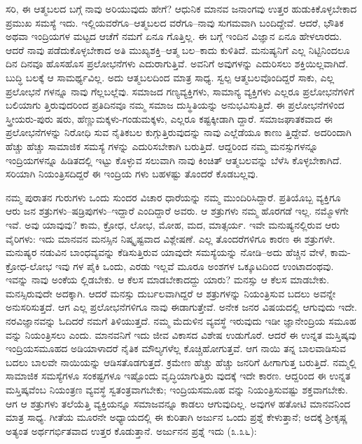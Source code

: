 ಸರಿ, ಈ ಆತ್ಮಬಲದ ಬಗ್ಗೆ ನಾವು ಅರಿಯುವುದು ಹೇಗೆ? ಆಧುನಿಕ ಮಾನವ ಜನಾಂಗವು ಉತ್ತರ ಹುಡುಕಿಕೊಳ್ಳಬೇಕಾದ ಪ್ರಮುಖ ಸಮಸ್ಯೆ ಇದು. ಇಲ್ಲಿಯವರೆಗೂ–ಆತ್ಮಬಲದ ವರೆಗೂ–ನಾವು ಸುಗಮವಾಗಿ ಬಂದಿದ್ದೇವೆ. ಆದರೆ, ಭೌತಿಕ ಅಥವಾ ಇಂದ್ರಿಯಗಳ ಮಟ್ಟದ ಆಚೆಗೆ ನಮಗೆ ಏನೂ ಗೊತ್ತಿಲ್ಲ. ಈ ಬಗ್ಗೆ ಇಂದಿನ ವಿಜ್ಞಾನ ಏನೂ ಹೇಳಲಾರದು. ಆದರೆ ನಾವು ಪಡೆದುಕೊಳ್ಳಬೇಕಾದ ಅತಿ ಮುಖ್ಯಶಕ್ತಿ–ಆತ್ಮ ಬಲ–ಕಾದು ಕುಳಿತಿದೆ. ಮನುಷ್ಯನಿಗೆ ಎಲ್ಲ ನಿಟ್ಟಿನಿಂದಲೂ ದಿನ ದಿನವೂ ಹೊಸಹೊಸ ಪ್ರಲೋಭನೆಗಳು ಎದುರಾಗುತ್ತಿವೆ. ಅವನಿಗೆ ಅವುಗಳನ್ನು ಎದುರಿಸಲು ಶಕ್ತಿಯಿಲ್ಲವಾಗಿದೆ. ಬುದ್ಧಿ ಬಲಕ್ಕೆ ಆ ಸಾಮರ್ಥ್ಯವಿಲ್ಲ. ಅದು ಆತ್ಮಬಲದಿಂದ ಮಾತ್ರ ಸಾಧ್ಯ. ಸ್ವಲ್ಪ ಆತ್ಮಬಲವೊಂದಿದ್ದರೆ ಸಾಕು, ಎಲ್ಲ ಪ್ರಲೋಭನೆ ಗಳನ್ನೂ ನಾವು ಗೆಲ್ಲಬಲ್ಲೆವು. ಸಮಾಜದ ಗಣ್ಯವ್ಯಕ್ತಿಗಳು, ಸಾಮಾನ್ಯ ವ್ಯಕ್ತಿಗಳು ಎಲ್ಲರೂ ಪ್ರಲೋಭನೆಗಳಿಗೆ ಬಲಿಯಾಗು ತ್ತಿರುವುದರಿಂದ ಪ್ರತಿದಿನವೂ ನಮ್ಮ ಸಮಾಜ ದುಸ್ಥಿತಿಯನ್ನು ಅನುಭವಿಸುತ್ತಿದೆ. ಈ ಪ್ರಲೋಭನೆಗಳಿಂದ ಸ್ತ್ರೀಯರು-ಪುರು ಷರು, ಹೆಣ್ಣುಮಕ್ಕಳು-ಗಂಡುಮಕ್ಕಳು, ಎಲ್ಲರೂ ಕಷ್ಟಕ್ಕೀಡಾಗಿ ದ್ದಾರೆ. ಸಮಾಜಘಾತಕವಾದ ಈ ಪ್ರಲೋಭನೆಗಳನ್ನು ನಿರೋಧಿ ಸುವ ನೈತಿಕಬಲ ಕುಗ್ಗುತ್ತಿರುವುದನ್ನು ನಾವು ಎಲ್ಲೆಡೆಯೂ ಕಾಣು ತ್ತಿದ್ದೇವೆ. ಅದರಿಂದಾಗಿ ಹೆಚ್ಚು ಹೆಚ್ಚು ಸಾಮಾಜಿಕ ಸಮಸ್ಯೆ ಗಳನ್ನು ಎದುರಿಸಬೇಕಾಗಿ ಬರುತ್ತಿದೆ. ಆದ್ದರಿಂದ ನಮ್ಮ ಮನಸ್ಸುಗಳನ್ನೂ ಇಂದ್ರಿಯಗಳನ್ನೂ ಹಿಡಿತದಲ್ಲಿ ಇಟ್ಟು ಕೊಳ್ಳುವ ಸಲುವಾಗಿ ನಾವು ಕಿಂಚಿತ್ ಆತ್ಮಬಲವನ್ನು ಬೆಳೆಸಿ ಕೊಳ್ಳಬೇಕಾಗಿದೆ. ಸರಿಯಾಗಿ ನಿಯಂತ್ರಿಸದಿದ್ದರೆ ಈ ಇಂದ್ರಿಯ ಗಳು ಬಹಳಷ್ಟು ತೊಂದರೆ ಕೊಡಬಲ್ಲವು.

ನಮ್ಮ ಪುರಾತನ ಗುರುಗಳು ಒಂದು ಸುಂದರ ವಿಚಾರ ಧಾರೆಯನ್ನು ನಮ್ಮ ಮುಂದಿರಿಸಿದ್ದಾರೆ. ಪ್ರತಿಯೊಬ್ಬ ವ್ಯಕ್ತಿಗೂ ಆರು ಜನ ಶತ್ರುಗಳು–ಷಡ್ರಿಪುಗಳು–ಇದ್ದಾರೆ ಎಂದಿದ್ದಾರೆ ಅವರು. ಆ ಶತ್ರುಗಳು ನಮ್ಮ ಹೊರಗಡೆ ಇಲ್ಲ. ನಮ್ಮೊಳಗೇ ಇವೆ. ಅವು ಯಾವುವು? ಕಾಮ, ಕ್ರೋಧ, ಲೋಭ, ಮೋಹ, ಮದ, ಮಾತ್ಸರ್ಯ. ಇವೇ ಮನುಷ್ಯನಲ್ಲಿರುವ ಆರು ವೈರಿಗಳು: ಇದು ಮಾನವನ ಮನಸ್ಸಿನ ನಿಷ್ಕೃಷ್ಟವಾದ ವಿಶ್ಲೇಷಣೆ. ಎಲ್ಲ ತೊಂದರೆಗಳಿಗೂ ಕಾರಣ ಈ ಶತ್ರುಗಳೇ. ಮನುಷ್ಯರ ನಡುವಿನ ಬಾಂಧವ್ಯವನ್ನು ಕೆಡಿಸುತ್ತಿರುವ ಯಾವುದೇ ಸಮಸ್ಯೆಯನ್ನು ನೋಡಿ–ಅದು ಹೆಚ್ಚಿನ ವೇಳೆ, ಕಾಮ-ಕ್ರೋಧ-ಲೋಭ ಇವು ಗಳ ಪೈಕಿ ಒಂದು, ಎರಡು ಇಲ್ಲವೆ ಮೂರೂ ಅಂಶಗಳ ಒಕ್ಕೂಟದಿಂದ ಉಂಟಾದಂಥವು. ಇವನ್ನು ನಾವು ಅಂಕೆಯ ಲ್ಲಿಡಬೇಕು. ಆ ಕೆಲಸ ಮಾಡಬೇಕಾದದ್ದು ಯಾರು? ಮನಸ್ಸು ಆ ಕೆಲಸ ಮಾಡಬೇಕು. ಮನಸ್ಸಿರುವುದೇ ಅದಕ್ಕಾಗಿ. ಆದರೆ ಮನಸ್ಸು ದುರ್ಬಲವಾಗಿದ್ದರೆ ಆ ಶತ್ರುಗಳನ್ನು ನಿಯಂತ್ರಿಸುವ ಬದಲು ಅವನ್ನೇ ಅನುಸರಿಸುತ್ತದೆ. ಆಗ ಎಲ್ಲ ಪ್ರಲೋಭನೆಗಳಿಗೂ ನಾವು ಈಡಾಗುತ್ತೇವೆ. ಅನೇಕ ಜನರ ವಿಷಯದಲ್ಲಿ ಆಗುವುದು ಇದೇ. ನರವಿಜ್ಞಾನವನ್ನು ಓದಿದರೆ ನಮಗೆ ತಿಳಿಯುತ್ತದೆ. ನಮ್ಮ ಮೆದುಳಿನ ವ್ಯವಸ್ಥೆ ಇರುವುದು ಇಡೀ ಜ್ಞಾನೇಂದ್ರಿಯ ಸಮೂಹ ವನ್ನು ನಿಯಂತ್ರಿಸಲು ಎಂದು. ಮಾನವನಿಗೆ ಇದು ಜೀವ ವಿಕಾಸದ ವಿಶೇಷ ಉಡುಗೊರೆ. ಆದರೆ ಈ ಉನ್ನತ ಮಸ್ತಿಷ್ಕವು ಇಂದ್ರಿಯಸಮೂಹದ ಅಡಿಯಾಳಾದರೆ ನೈತಿಕ ಮೌಲ್ಯಗಳೆಲ್ಲ ಕೊಚ್ಚಿಹೋಗುತ್ತವೆ. ಆಗ ನಾಯಿ ತನ್ನ ಬಾಲವಾಡಿಸುವ ಬದಲು ಬಾಲವೇ ನಾಯಿಯನ್ನು ಆಡಿಸತೊಡಗುತ್ತದೆ. ಕ್ರಮೇಣ ಹೆಚ್ಚು ಹೆಚ್ಚು ಜನರಿಗೆ ಹೀಗಾಗುತ್ತ ಬರುತ್ತಿದೆ. ನಮ್ಮಲ್ಲಿ ಸಾಮಾಜಿಕ ಸಮಸ್ಯೆಗಳೂ ಸಂಕಷ್ಟಗಳೂ ಇಷ್ಟೊಂದು ವೃದ್ಧಿಯಾಗುತ್ತಿರು ವುದಕ್ಕೆ ಇದೇ ಕಾರಣ. ಆದ್ದರಿಂದ ಈ ಉನ್ನತ ಮಸ್ತಿಷ್ಕವೆಂಬ ನಿಯಂತ್ರಣ ವ್ಯವಸ್ಥೆ ಸ್ವತಂತ್ರವಾಗಬೇಕು; ಇಂದ್ರಿಯಸಮೂಹ ವನ್ನು ನಿಯಂತ್ರಿಸುವಷ್ಟು ಶಕ್ತವಾಗಬೇಕು. ಆಗ ಆ ಶತ್ರುಗಳು ತಲೆಯೆತ್ತಿ ವ್ಯಕ್ತಿಯನ್ನೂ ಸಮಾಜವನ್ನೂ ಕಾಡಲು ಆಗುವುದಿಲ್ಲ. ಅವುಗಳ ಹತೋಟಿ ಮಾನವನಿಂದ ಮಾತ್ರ ಸಾಧ್ಯ. ಗೀತೆಯ ಮೂರನೇ ಅಧ್ಯಾಯದಲ್ಲಿ ಈ ಕುರಿತಾಗಿ ಅರ್ಜುನ ಒಂದು ಪ್ರಶ್ನೆ ಕೇಳುತ್ತಾನೆ; ಅದಕ್ಕೆ ಶ್ರೀಕೃಷ್ಣ ಅತ್ಯಂತ ಅರ್ಥಗರ್ಭಿತವಾದ ಉತ್ತರ ಕೊಡುತ್ತಾನೆ. ಅರ್ಜುನನ ಪ್ರಶ್ನೆ ಇದು (೩.೩೬):

